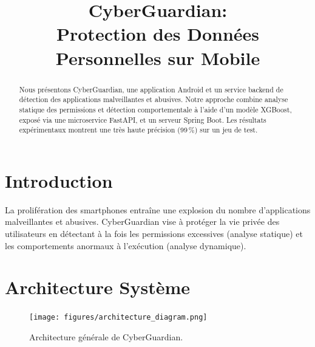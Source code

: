 \documentclass[conference]{IEEEtran}
\title{CyberGuardian:\\Protection des Données Personnelles sur Mobile}
\author{
  \IEEEauthorblockN{Amine \textit{et al.}}
  \IEEEauthorblockA{
    Département Informatique, Université X\\
    \{amine, coauthor\}@exemple.edu
  }
}
\begin{document}
\maketitle

\begin{abstract}
Nous présentons CyberGuardian, une application Android et un service backend
de détection des applications malveillantes et abusives. 
Notre approche combine analyse statique des permissions et détection comportementale à 
l’aide d’un modèle XGBoost, exposé via une microservice FastAPI, et un serveur Spring Boot. 
Les résultats expérimentaux montrent une très haute précision (99\,\%) sur un jeu de test.
\end{abstract}

\section{Introduction}
La prolifération des smartphones entraîne une explosion du nombre d'applications malveillantes
et abusives. CyberGuardian vise à protéger la vie privée des utilisateurs
en détectant à la fois les permissions excessives (analyse statique) 
et les comportements anormaux à l'exécution (analyse dynamique).

\section{Architecture Système}
\begin{figure}[h]
  \centering
  \texttt{[image: figures/architecture\_diagram.png]}
  \caption{Architecture générale de CyberGuardian.}\label{fig:arch}
\end{figure}
\end{document}
